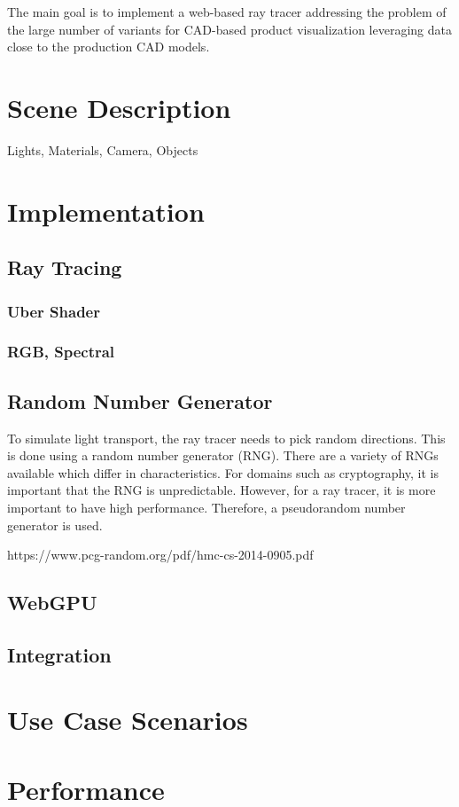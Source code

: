 
The main goal is to implement a web-based ray tracer addressing the problem of the large number of variants for CAD-based product visualization leveraging data close to the production CAD models.

\section{Scene Description}
Lights, Materials, Camera, Objects
\section{Implementation}
\subsection{Ray Tracing}
\subsubsection{Uber Shader}
\subsubsection{RGB, Spectral}
\subsection{Random Number Generator}

To simulate light transport, the ray tracer needs to pick random directions. This is done using a random number generator (RNG). There are a variety of RNGs available which differ in characteristics. For domains such as cryptography, it is important that the RNG is unpredictable. However, for a ray tracer, it is more important to have high performance. Therefore, a pseudorandom number generator is used.

https://www.pcg-random.org/pdf/hmc-cs-2014-0905.pdf

\subsection{WebGPU}
\subsection{Integration}
\section{Use Case Scenarios}
\section{Performance}